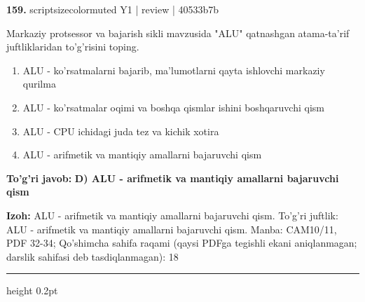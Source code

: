 \documentclass[10pt,a4paper]{article}
\begin{document}
{\bfseries\sffamily\color{ink} 159.} {scriptsizecolor{muted} Y1 | review | 40533b7b}
\par
Markaziy protsessor va bajarish sikli mavzusida "ALU" qatnashgan atama-ta'rif juftliklaridan to'g'risini toping.
\begin{enumerate}[label=\Alph*),leftmargin=9mm]
\item ALU - ko'rsatmalarni bajarib, ma'lumotlarni qayta ishlovchi markaziy qurilma
\item ALU - ko'rsatmalar oqimi va boshqa qismlar ishini boshqaruvchi qism
\item ALU - CPU ichidagi juda tez va kichik xotira
\item ALU - arifmetik va mantiqiy amallarni bajaruvchi qism
\end{enumerate}
\begin{tcolorbox}[enhanced,breakable,colback=teal!4,colframe=teal!60!black,boxrule=0.45pt,arc=1.2mm,left=2.7mm,right=2.7mm,top=1.8mm,bottom=1.8mm,before skip=2mm,after skip=2mm]
{\bfseries\sffamily\color{teal}To'g'ri javob:} \textbf{D) ALU - arifmetik va mantiqiy amallarni bajaruvchi qism}
\par\smallskip
{\bfseries Izoh:} ALU - arifmetik va mantiqiy amallarni bajaruvchi qism. To'g'ri juftlik: ALU - arifmetik va mantiqiy amallarni bajaruvchi qism. Manba: CAM10/11, PDF 32-34; Qo'shimcha sahifa raqami (qaysi PDFga tegishli ekani aniqlanmagan; darslik sahifasi deb tasdiqlanmagan): 18
\end{tcolorbox}
\vspace{2mm}\hrule height 0.2pt\vspace{3mm}
\end{document}
